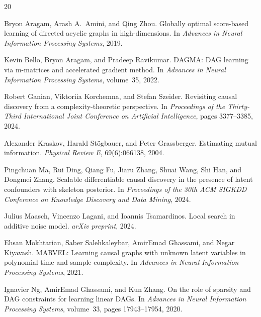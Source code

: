 \documentclass{article}
\begin{document}

\begin{thebibliography}{20}

Bryon Aragam, Arash A.~Amini, and Qing Zhou.
\newblock Globally optimal score-based learning of directed acyclic graphs in high-dimensions.
\newblock In \emph{Advances in Neural Information Processing Systems}, 2019.

Kevin Bello, Bryon Aragam, and Pradeep Ravikumar.
\newblock DAGMA: DAG learning via m-matrices and accelerated gradient method.
\newblock In \emph{Advances in Neural Information Processing Systems}, volume~35, 2022.

Robert Ganian, Viktoriia Korchemna, and Stefan Szeider.
\newblock Revisiting causal discovery from a complexity-theoretic perspective.
\newblock In \emph{Proceedings of the Thirty-Third International Joint Conference on Artificial Intelligence}, pages 3377--3385, 2024.

Alexander Kraskov, Harald St\"{o}gbauer, and Peter Grassberger.
\newblock Estimating mutual information.
\newblock \emph{Physical Review E}, 69(6):066138, 2004.

Pingchuan Ma, Rui Ding, Qiang Fu, Jiaru Zhang, Shuai Wang, Shi Han, and Dongmei Zhang.
\newblock Scalable differentiable causal discovery in the presence of latent confounders with skeleton posterior.
\newblock In \emph{Proceedings of the 30th ACM SIGKDD Conference on Knowledge Discovery and Data Mining}, 2024.

Julius Maasch, Vincenzo Lagani, and Ioannis Tsamardinos.
\newblock Local search in additive noise model.
\newblock \emph{arXiv preprint}, 2024.

Ehsan Mokhtarian, Saber Salehkaleybar, AmirEmad Ghassami, and Negar Kiyavash.
\newblock MARVEL: Learning causal graphs with unknown latent variables in polynomial time and sample complexity.
\newblock In \emph{Advances in Neural Information Processing Systems}, 2021.

Ignavier Ng, AmirEmad Ghassami, and Kun Zhang.
\newblock On the role of sparsity and DAG constraints for learning linear DAGs.
\newblock In \emph{Advances in Neural Information Processing Systems}, volume~33, pages 17943--17954, 2020.


\end{thebibliography}
\end{document}
